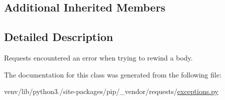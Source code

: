 \subsection*{Additional Inherited Members}


\subsection{Detailed Description}
\begin{DoxyVerb}Requests encountered an error when trying to rewind a body.\end{DoxyVerb}
 

The documentation for this class was generated from the following file\+:\begin{DoxyCompactItemize}
\item 
venv/lib/python3./site-\/packages/pip/\+\_\+vendor/requests/\hyperlink{pip_2__vendor_2requests_2exceptions_8py}{exceptions.\+py}\end{DoxyCompactItemize}
